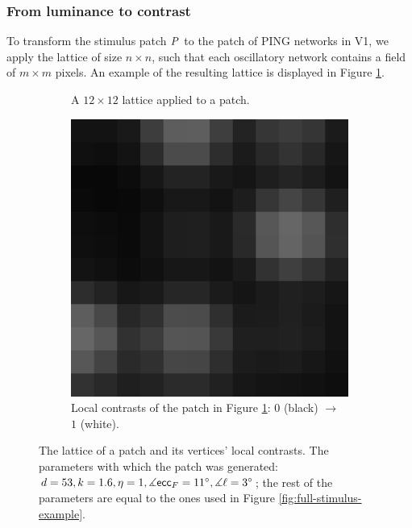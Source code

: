 \subsubsection{From luminance to contrast}

To transform the stimulus patch $P$ to the patch of PING networks in V1, we apply the lattice of size $n \times n$, such that each oscillatory network contains a field of $m \times m$ pixels. An example of the resulting lattice is displayed in Figure \ref{fig:llc-lattice-example}.


\begin{figure}[!htp]
    \centering
    \begin{subfigure}[t]{0.4\textwidth}
        \centering
        
        \caption{A $12 \times 12$ lattice applied to a patch.}
        \label{fig:llc-lattice-example}
    \end{subfigure}
    \hspace{0.06\textwidth}
    \begin{subfigure}[t]{0.4\textwidth}
        \centering
        \includegraphics[width=\textwidth]{src/assets/images/local-contrast.png}
        \caption{Local contrasts of the patch in Figure \ref{fig:llc-lattice-example}: $0$ (black) $\to$ $1$ (white).}
        \label{fig:llc-local-contrast-example}
    \end{subfigure}
    \caption[Patch lattice and local contrast]{The lattice of a patch and its vertices' local contrasts. The parameters with which the patch was generated: $d = 53, k = 1.6, \eta = 1, \measuredangle \mathsf{ecc}_F = 11^\circ, \measuredangle \ell = 3^\circ$; the rest of the parameters are equal to the ones used in Figure \ref{fig:full-stimulus-example}.}
    \label{fig:lattice-local-contrast-example}
\end{figure}


